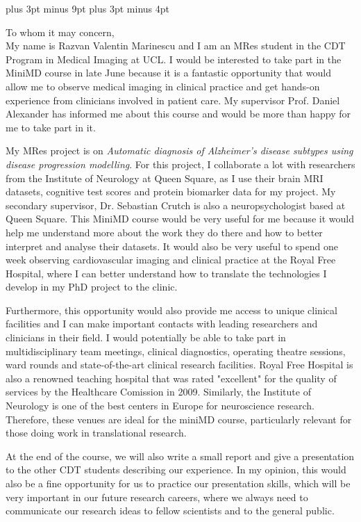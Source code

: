 \documentclass[12pt,a4paper,oneside]{report}
\begin{document}
\belowdisplayskip=12pt plus 3pt minus 9pt
\belowdisplayshortskip=7pt plus 3pt minus 4pt


To whom it may concern,\\

My name is Razvan Valentin Marinescu and I am an MRes student in the CDT Program in Medical Imaging at UCL. I would be interested to take part in the MiniMD course in late June because it is a fantastic opportunity that would allow me to observe medical imaging in clinical practice and get hands-on experience from clinicians involved in patient care. My supervisor Prof. Daniel Alexander has informed me about this course and would be more than happy for me to take part in it.

My MRes project is on \emph{Automatic diagnosis of Alzheimer's disease subtypes using disease progression modelling}. For this project, I collaborate a lot with researchers from the Institute of Neurology at Queen Square, as I use their brain MRI datasets, cognitive test scores and protein biomarker data for my project. My secondary supervisor, Dr. Sebastian Crutch is also a neuropsychologist based at Queen Square. This MiniMD course would be very useful for me because it would help me understand more about the work they do there and how to better interpret and analyse their datasets. It would also be very useful to spend one week observing cardiovascular imaging and clinical practice at the Royal Free Hospital, where I can better understand how to translate the technologies I develop in my PhD project to the clinic.

Furthermore, this opportunity would also provide me access to unique clinical facilities and I can make important contacts with leading researchers and clinicians in their field. I would potentially be able to take part in multidisciplinary team meetings, clinical diagnostics, operating theatre sessions, ward rounds and state-of-the-art clinical research facilities. Royal Free Hospital is also a renowned teaching hospital that was rated "excellent" for the quality of services by the Healthcare Comission in 2009. Similarly, the Institute of Neurology is one of the best centers in Europe for neuroscience research. Therefore, these venues are ideal for the miniMD course, particularly relevant for those doing work in translational research. 

At the end of the course, we will also write a small report and give a presentation to the other CDT students describing our experience. In my opinion, this would also be a fine opportunity for us to practice our presentation skills, which will be very important in our future research careers, where we always need to communicate our research ideas to fellow scientists and to the general public. 
\end{document}
